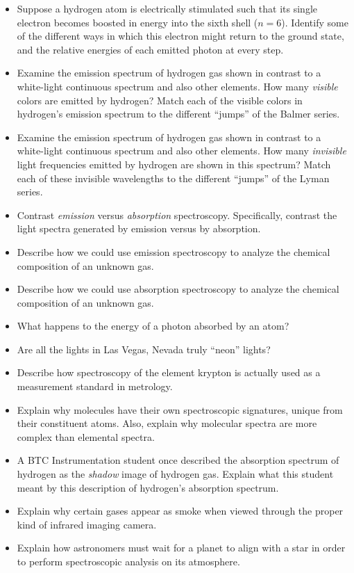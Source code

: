 \begin{itemize}
\item{} Suppose a hydrogen atom is electrically stimulated such that its single electron becomes boosted in energy into the sixth shell ($n = 6$).  Identify some of the different ways in which this electron might return to the ground state, and the relative energies of each emitted photon at every step.
\item{} Examine the emission spectrum of hydrogen gas shown in contrast to a white-light continuous spectrum and also other elements.  How many {\it visible} colors are emitted by hydrogen?  Match each of the visible colors in hydrogen's emission spectrum to the different ``jumps'' of the Balmer series.
\item{} Examine the emission spectrum of hydrogen gas shown in contrast to a white-light continuous spectrum and also other elements.  How many {\it invisible} light frequencies emitted by hydrogen are shown in this spectrum?  Match each of these invisible wavelengths to the different ``jumps'' of the Lyman series.
\item{} Contrast {\it emission} versus {\it absorption} spectroscopy.  Specifically, contrast the light spectra generated by emission versus by absorption.
\item{} Describe how we could use emission spectroscopy to analyze the chemical composition of an unknown gas.
\item{} Describe how we could use absorption spectroscopy to analyze the chemical composition of an unknown gas.
\item{} What happens to the energy of a photon absorbed by an atom?
\item{} Are all the lights in Las Vegas, Nevada truly ``neon'' lights?
\item{} Describe how spectroscopy of the element krypton is actually used as a measurement standard in metrology.
\item{} Explain why molecules have their own spectroscopic signatures, unique from their constituent atoms.  Also, explain why molecular spectra are more complex than elemental spectra.
\item{} A BTC Instrumentation student once described the absorption spectrum of hydrogen as the {\it shadow} image of hydrogen gas.  Explain what this student meant by this description of hydrogen's absorption spectrum.
\item{} Explain why certain gases appear as smoke when viewed through the proper kind of infrared imaging camera.
\item{} Explain how astronomers must wait for a planet to align with a star in order to perform spectroscopic analysis on its atmosphere.
\end{itemize}










